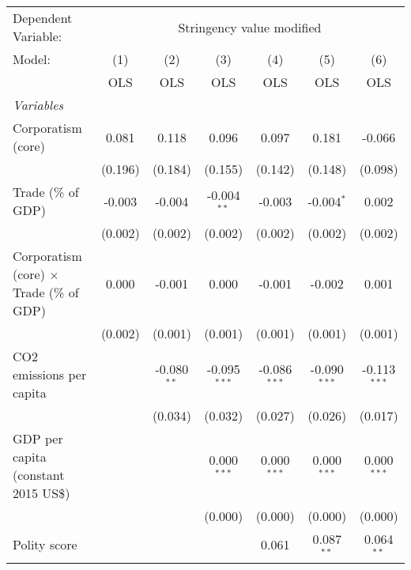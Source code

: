 
\begingroup
\centering
\begin{tabular}{lcccccc}
   \toprule
   Dependent Variable: & \multicolumn{6}{c}{Stringency value modified}\\
   Model:                                          & (1)     & (2)           & (3)            & (4)            & (5)            & (6)\\  
                                                   &  OLS    & OLS           & OLS            & OLS            & OLS            & OLS\\  
   \midrule
   \emph{Variables}\\
   Corporatism (core)                              & 0.081   & 0.118         & 0.096          & 0.097          & 0.181          & -0.066\\   
                                                   & (0.196) & (0.184)       & (0.155)        & (0.142)        & (0.148)        & (0.098)\\   
   Trade (\% of GDP)                               & -0.003  & -0.004        & -0.004$^{**}$  & -0.003         & -0.004$^{*}$   & 0.002\\   
                                                   & (0.002) & (0.002)       & (0.002)        & (0.002)        & (0.002)        & (0.002)\\   
   Corporatism (core) $\times$ Trade (\% of GDP)   & 0.000   & -0.001        & 0.000          & -0.001         & -0.002         & 0.001\\   
                                                   & (0.002) & (0.001)       & (0.001)        & (0.001)        & (0.001)        & (0.001)\\   
   CO2 emissions per capita                        &         & -0.080$^{**}$ & -0.095$^{***}$ & -0.086$^{***}$ & -0.090$^{***}$ & -0.113$^{***}$\\   
                                                   &         & (0.034)       & (0.032)        & (0.027)        & (0.026)        & (0.017)\\   
   GDP per capita (constant 2015 US\$)             &         &               & 0.000$^{***}$  & 0.000$^{***}$  & 0.000$^{***}$  & 0.000$^{***}$\\   
                                                   &         &               & (0.000)        & (0.000)        & (0.000)        & (0.000)\\   
   Polity score                                    &         &               &                & 0.061          & 0.087$^{**}$   & 0.064$^{**}$\\   

\end{tabular}
